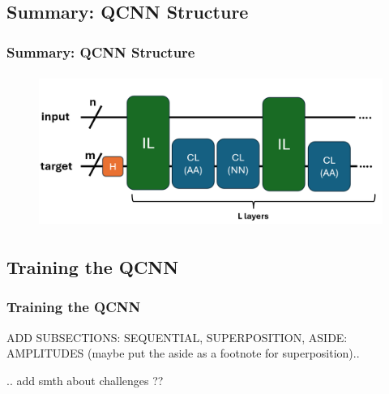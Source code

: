 \documentclass{beamer}
\begin{document}
\begin{frame}
\subsection{Summary: QCNN Structure}
\frametitle{Summary: QCNN Structure}
\begin{figure}[ht]
\begin{center}
\includegraphics[height=5cm]{im/QCNN_structure}
\end{center}
\end{figure}
\end{frame}

\begin{frame}
\section{Training the QCNN}
\frametitle{Training the QCNN}
ADD SUBSECTIONS: SEQUENTIAL, SUPERPOSITION, ASIDE: AMPLITUDES  (maybe put the aside as a footnote for superposition)..

.. add smth about challenges ?? 
\end{frame}
\end{document}
